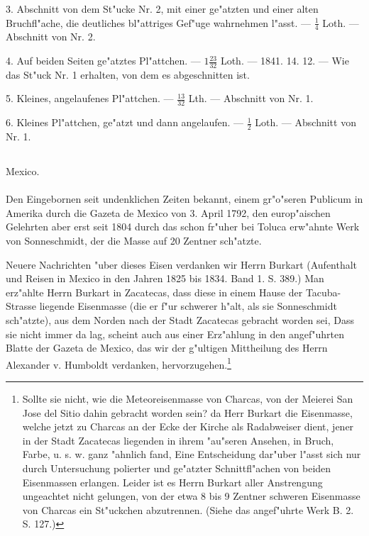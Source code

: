 \documentclass[a4paper, 11pt, oneside, polutonikogreek, german]{article}
\begin{document}
3. Abschnitt von dem St"ucke Nr. 2, mit einer ge"atzten und einer alten Bruchfl"ache, die deutliches bl"attriges Gef"uge wahrnehmen l"asst. --- $\frac{1}{4}$ Loth. --- Abschnitt von Nr. 2.

4. Auf beiden Seiten ge"atztes Pl"attchen. --- $1\frac{23}{32}$ Loth. --- 1841. 14. 12. --- Wie das St"uck Nr. 1 erhalten, von dem es abgeschnitten ist.

5. Kleines, angelaufenes Pl"attchen. --- $\frac{13}{32}$ Lth. --- Abschnitt von Nr. 1.

6. Kleines Pl"attchen, ge"atzt und dann angelaufen. --- $\frac{1}{2}$ Loth. --- Abschnitt von Nr. 1.
\subsection{}
\begin{center}

Mexico.
\end{center}
\paragraph{}
Den Eingebornen seit undenklichen Zeiten bekannt, einem gr"o"seren Publicum in Amerika durch die Gazeta de Mexico von 3. April 1792, den europ"aischen Gelehrten aber erst seit 1804 durch das schon fr"uher bei Toluca erw"ahnte Werk von Sonneschmidt, der die Masse auf 20 Zentner sch"atzte.

\setlength{\leftskip}{10mm}
\setlength{\parindent}{0pt}

{\footnotesize Neuere Nachrichten "uber dieses Eisen verdanken wir Herrn Burkart (Aufenthalt und Reisen in Mexico in den Jahren 1825 bis 1834. Band 1. S. 389.) Man erz"ahlte Herrn Burkart in Zacatecas, dass diese in einem Hause der Tacuba-Strasse liegende Eisenmasse (die er f"ur schwerer h"alt, als sie Sonneschmidt sch"atzte), aus dem Norden nach der Stadt Zacatecas gebracht worden sei, Dass sie nicht immer da lag, scheint auch aus einer Erz"ahlung in den angef"uhrten Blatte der Gazeta de Mexico, das wir der g"ultigen Mittheilung des Herrn Alexander v. Humboldt verdanken, hervorzugehen.\footnote{ Sollte sie nicht, wie die Meteoreisenmasse von Charcas, von der Meierei San Jose del Sitio dahin gebracht worden sein? da Herr Burkart die Eisenmasse, welche jetzt zu Charcas an der Ecke der Kirche als Radabweiser dient, jener in der Stadt Zacatecas liegenden in ihrem "au"seren Ansehen, in Bruch, Farbe, u. s. w. ganz "ahnlich fand, Eine Entscheidung dar"uber l"asst sich nur durch Untersuchung polierter und ge"atzter Schnittfl"achen von beiden Eisenmassen erlangen. Leider ist es Herrn Burkart aller Anstrengung ungeachtet nicht gelungen, von der etwa 8 bis 9 Zentner schweren Eisenmasse von Charcas ein St"uckchen abzutrennen. (Siehe das angef"uhrte Werk B. 2. S. 127.)}}
\end{document}

